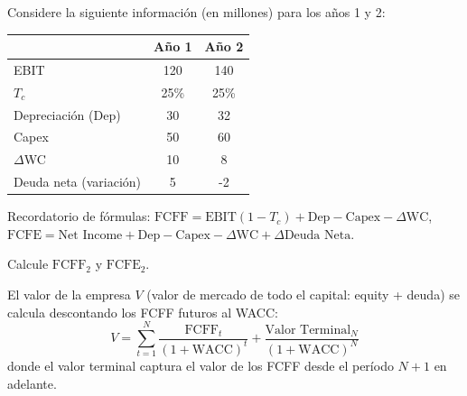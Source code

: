 \begin{ejemplo}
Considere la siguiente información (en millones) para los años 1 y 2:

\begin{center}
\begin{tabular}{lcc}
\toprule
 & Año 1 & Año 2 \\
\midrule
EBIT & 120 & 140 \\
$T_c$ & 25\% & 25\% \\
Depreciación (Dep) & 30 & 32 \\
Capex & 50 & 60 \\
$\Delta$WC & 10 & 8 \\
Deuda neta (variación) & 5 & -2 \\
\bottomrule
\end{tabular}
\end{center}

Recordatorio de fórmulas: $\text{FCFF} = \text{EBIT}(1 - T_c) + \text{Dep} - \text{Capex} - \Delta \text{WC}$,\; $\text{FCFE} = \text{Net~Income} + \text{Dep} - \text{Capex} - \Delta \text{WC} + \Delta \text{Deuda Neta}$.

Calcule $\text{FCFF}_2$ y $\text{FCFE}_2$.
\end{ejemplo}

\begin{teorema}
El valor de la empresa $V$ (valor de mercado de todo el capital: equity + deuda) se calcula descontando los FCFF futuros al WACC:
\begin{equation}
V = \sum_{t=1}^{N} \frac{\text{FCFF}_t}{(1 + \text{WACC})^t} + \frac{\text{Valor Terminal}_N}{(1 + \text{WACC})^N}
\end{equation}
donde el valor terminal captura el valor de los FCFF desde el período $N+1$ en adelante.
\end{teorema}

